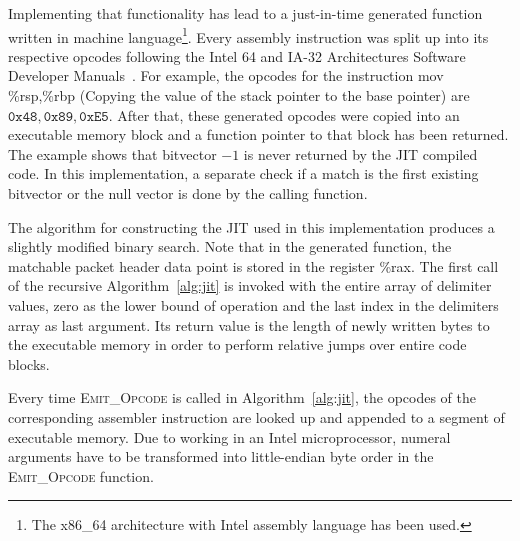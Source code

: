 \documentclass[a4paper,
		12pt,
		parskip=full,
		titlepage
		]{scrartcl}
\begin{document}
Implementing that functionality has lead to a just-in-time generated function written in machine 
language\footnote{The x86\_64 architecture with Intel assembly language has been used.}.
Every assembly instruction was split up into its respective opcodes following the 
Intel 64 and IA-32 Architectures Software Developer Manuals~\cite{intelsys}.
For example, the opcodes for the instruction 
\textsf{mov \%rsp,\%rbp} (Copying the value of the stack pointer to the base pointer) 
are $\texttt{0x48}, \texttt{0x89}, \texttt{0xE5}$.
After that, these generated opcodes were copied into an executable memory block and a function pointer to that block has been returned.
The example shows that bitvector $-1$ is never returned by the JIT compiled code.
In this implementation, a separate check if a match is the first existing bitvector or the null 
vector is done by the calling function.

The algorithm for constructing the JIT used in this implementation produces a slightly modified binary search.
Note that in the generated function, the matchable packet header data point is stored in the register \textsf{\%rax}.
The first call of the recursive Algorithm~\ref{alg:jit} is invoked with the entire array of delimiter values,
zero as the lower bound of operation and the last index in the delimiters array as last argument.
Its return value is the length of newly written bytes to the executable memory in order to perform relative jumps over entire code blocks.

Every time \textsc{Emit\_Opcode} is called in Algorithm~\ref{alg:jit}, the opcodes 
of the corresponding assembler instruction are looked up and appended to a segment of executable memory.
Due to working in an Intel microprocessor, numeral arguments have to be 
transformed into little-endian byte order in the \textsc{Emit\_Opcode} function.
\end{document}
